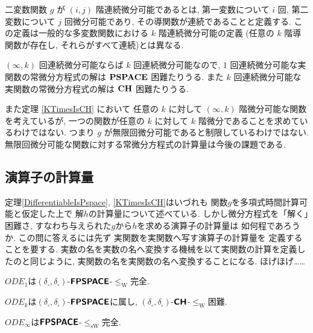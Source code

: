  二変数関数 $g$ が $(i, j)$ 階連続微分可能であるとは,
 第一変数について $i$ 回, 第二変数について $j$ 回微分可能であり,
 その導関数が連続であることと定義する.
 この定義は一般的な多変数関数における $k$ 階連続微分可能の定義
 (任意の $k$ 階導関数が存在し, それらがすべて連続)とは異なる.

$(\infty, k)$ 回連続微分可能ならば $k$ 回連続微分可能なので,
$1$ 回連続微分可能な実関数の常微分方程式の解は $\mathbf{PSPACE}$ 困難たりうる.
また $k$ 回連続微分可能な実関数の常微分方程式の解は $\mathbf{CH}$ 困難たりうる.

 また定理 \ref{KTimesIsCH} において
 任意の $k$ に対して $(\infty, k)$ 階微分可能な関数を考えているが,
 一つの関数が任意の $k$ に対して $k$ 階微分であることを求めているわけではない.
 つまり $g$ が無限回微分可能であると制限しているわけではない. 
 無限回微分可能な関数に対する常微分方程式の計算量は今後の課題である.


\subsection{演算子の計算量}

定理\ref{DifferentiableIsPspace}, 
\ref{KTimesIsCH}はいづれも
関数$g$を多項式時間計算可能と仮定した上で
解$h$の計算量について述べている. 
しかし微分方程式を「解く」困難さ, 
すなわち与えられた$g$から$h$を求める演算子の計算量は
如何程であろうか. 
この問に答えるには先ず
実関数を実関数へ写す演算子の計算量を
定義することを要する. 
実数の名を実数の名へ変換する機械を以て実関数の計算を定義したのと同じように, 
実関数の名を実関数の名へ変換することになる. 
ほげほげ……

\newcommand{\OpDiffIVP}{\mathit{ODE}}
\newcommand{\deltabox}{\delta _\square}
\newcommand{\classtwofont}[1]{\text{\bfseries \sffamily \upshape #1}}
\newcommand{\classFPSPACEtwo}{\classtwofont{FPSPACE}}
\newcommand{\classCHtwo}{\classtwofont{CH}}
\newcommand{\redW}{\leq _{\mathrm W}}
\newcommand{\redSW}{\leq _{\mathrm{sW}}}

\begin{theorem}
$\OpDiffIVP _1$は$(\deltabox, \deltabox)$-$\classFPSPACEtwo$-$\redW$完全. 
\end{theorem}

\begin{theorem}
$\OpDiffIVP _k$は$(\deltabox, \deltabox)$-$\classFPSPACEtwo$に属し, 
$(\deltabox, \deltabox)$-$\classCHtwo$-$\redW$困難. 
\end{theorem}

\begin{theorem}
$\OpDiffIVP _\infty$は$\classFPSPACEtwo$-$\redSW$完全. 
\end{theorem}

